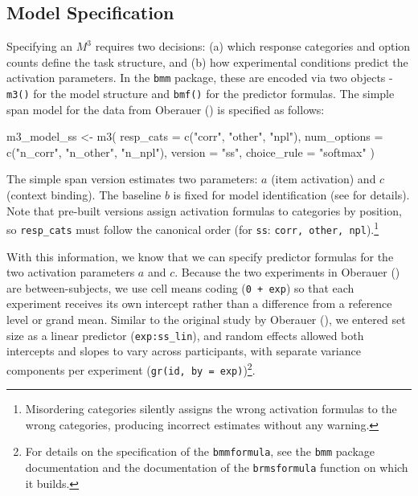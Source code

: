 \documentclass[
  man,
  floatsintext,
  longtable,
  nolmodern,
  notxfonts,
  notimes,
  colorlinks=true,linkcolor=blue,citecolor=blue,urlcolor=blue]{apa7}
\newenvironment{Shaded}{\begin{snugshade}}{\end{snugshade}}
\newcommand{\AttributeTok}[1]{\textcolor[rgb]{0.40,0.45,0.13}{#1}}
\newcommand{\FunctionTok}[1]{\textcolor[rgb]{0.28,0.35,0.67}{#1}}
\newcommand{\NormalTok}[1]{\textcolor[rgb]{0.00,0.23,0.31}{#1}}
\newcommand{\OtherTok}[1]{\textcolor[rgb]{0.00,0.23,0.31}{#1}}
\newcommand{\StringTok}[1]{\textcolor[rgb]{0.13,0.47,0.30}{#1}}
\begin{document}
\subsection{Model Specification}\label{model-specification}

Specifying an \(M^3\) requires two decisions: (a) which response
categories and option counts define the task structure, and (b) how
experimental conditions predict the activation parameters. In the
\texttt{bmm} package, these are encoded via two objects - \texttt{m3()}
for the model structure and \texttt{bmf()} for the predictor formulas.
The simple span model for the data from Oberauer
() is specified as follows:

\begin{Shaded}
\begin{Highlighting}[]
\NormalTok{m3\_model\_ss }\OtherTok{\textless{}{-}} \FunctionTok{m3}\NormalTok{(}
  \AttributeTok{resp\_cats   =} \FunctionTok{c}\NormalTok{(}\StringTok{"corr"}\NormalTok{, }\StringTok{"other"}\NormalTok{, }\StringTok{"npl"}\NormalTok{),}
  \AttributeTok{num\_options =} \FunctionTok{c}\NormalTok{(}\StringTok{"n\_corr"}\NormalTok{, }\StringTok{"n\_other"}\NormalTok{, }\StringTok{"n\_npl"}\NormalTok{),}
  \AttributeTok{version     =} \StringTok{"ss"}\NormalTok{,}
  \AttributeTok{choice\_rule =} \StringTok{"softmax"}
\NormalTok{)}
\end{Highlighting}
\end{Shaded}

The simple span version estimates two parameters: \(a\) (item
activation) and \(c\) (context binding). The baseline \(b\) is fixed for
model identification (see  for details). Note that pre-built versions assign
activation formulas to categories by position, so \texttt{resp\_cats}
must follow the canonical order (for \texttt{ss}:
\texttt{corr,\ other,\ npl}).\footnote{Misordering categories silently
  assigns the wrong activation formulas to the wrong categories,
  producing incorrect estimates without any warning.}

With this information, we know that we can specify predictor formulas
for the two activation parameters \(a\) and \(c\). Because the two
experiments in Oberauer () are
between-subjects, we use cell means coding (\texttt{0\ +\ exp}) so that
each experiment receives its own intercept rather than a difference from
a reference level or grand mean. Similar to the original study by
Oberauer (), we entered set
size as a linear predictor (\texttt{exp:ss\_lin}), and random effects
allowed both intercepts and slopes to vary across participants, with
separate variance components per experiment
(\texttt{gr(id,\ by\ =\ exp)})\footnote{For details on the specification
  of the \texttt{bmmformula}, see the \texttt{bmm} package documentation
  and the documentation of the \texttt{brmsformula} function on which it
  builds.}.
\end{document}
